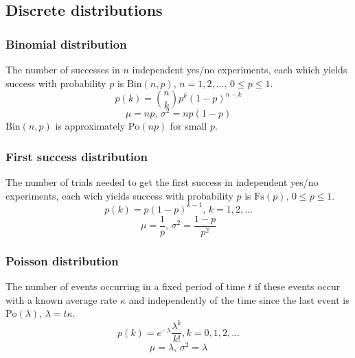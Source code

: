 

\subsection{Discrete distributions}

\subsubsection{Binomial distribution}
The number of successes in $n$ independent yes/no experiments, each which yields success with probability $p$ is $\textrm{Bin}(n,p),\,n=1,2,\dots,\, 0\leq p\leq1$.
\[p(k)=\binom{n}{k}p^k(1-p)^{n-k}\]
\[\mu = np,\,\sigma^2=np(1-p)\]
$\textrm{Bin}(n,p)$ is approximately $\textrm{Po}(np)$ for small $p$.\\

\subsubsection{First success distribution}
The number of trials needed to get the first success in independent yes/no experiments, each wich yields success with probability $p$ is $\textrm{Fs}(p),\,0\leq p\leq1$.
\[p(k)=p(1-p)^{k-1},\,k=1,2,\dots\]
\[\mu = \frac1p,\,\sigma^2=\frac{1-p}{p^2}\]

\subsubsection{Poisson distribution}
The number of events occurring in a fixed period of time $t$ if these events occur with a known average rate $\kappa$ and independently of the time since the last event is $\textrm{Po}(\lambda),\,\lambda=t\kappa$.
\[p(k)=e^{-\lambda}\frac{\lambda^k}{k!}, k=0,1,2,\dots\]
\[\mu=\lambda,\,\sigma^2=\lambda\]

